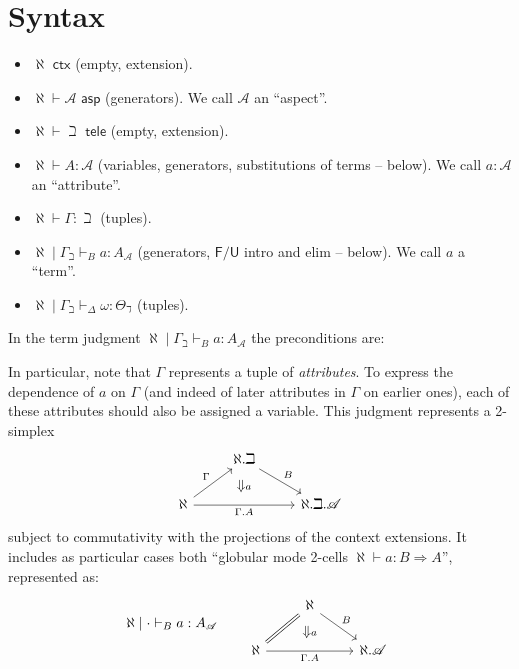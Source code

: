 \documentclass[10pt]{article}
\newcommand{\yields}{\vdash}
\newcommand{\cbar}{\mid}
\newcommand{\ctx}{\,\,\mathsf{ctx}}
\newcommand{\asp}{\,\,\mathsf{asp}}
\newcommand{\tele}{\,\,\mathsf{tele}}
\newcommand{\A}{\mathscr{A}}
\newcommand{\atA}{A}
\newcommand{\atB}{B}
\newcommand{\tma}{a}
\begin{document}
\section{Syntax}
\label{sec:syntax}

\begin{itemize}
\item $\aleph \ctx$ (empty, extension).
\item $\aleph \yields \A \asp$ (generators).  We call $\A$ an ``aspect''.
\item $\aleph \yields \beth \tele$ (empty, extension). %
\item $\aleph \yields \atA : \A$ (variables, generators, substitutions of terms -- below).  We call $a:\A$ an ``attribute''.
\item $\aleph \yields \Gamma : \beth$ (tuples). %
\item $\aleph \cbar \Gamma_\beth \yields_B \tma : \atA_\A$ (generators, $\mathsf{F}/\mathsf{U}$ intro and elim -- below).  We call $\tma$ a ``term''.
\item $\aleph \cbar \Gamma_\beth \yields_\Delta \omega : \Theta_\daleth$ (tuples).
\end{itemize}
In the term judgment $\aleph \cbar \Gamma_\beth \yields_B \tma : \atA_\A$ the preconditions are:
In particular, note that $\Gamma$ represents a tuple of \emph{attributes}.
To express the dependence of $\tma$ on $\Gamma$ (and indeed of later attributes in $\Gamma$ on earlier ones), each of these attributes should also be assigned a variable.
This judgment represents a 2-simplex
\[
\begin{tikzcd}
  & \aleph.\beth \ar[dr,"\atB"] \ar[d,phantom,"\Downarrow\scriptstyle \tma"] \\
  \aleph \ar[ur,"\Gamma"] \ar[rr,"\Gamma.\atA"'] & {} & \aleph.\beth.\A
\end{tikzcd}
\]
subject to commutativity with the projections of the context extensions.
It includes as particular cases both ``globular mode 2-cells $\aleph \yields \tma : \atB \Rightarrow \atA$'', represented as:
\[
\aleph \cbar \cdot \yields_\atB \tma : \atA_\A \qquad
\begin{tikzcd}
  & \aleph \ar[dr,"\atB"] \ar[d,phantom,"\Downarrow\scriptstyle \tma"] \\
  \aleph \ar[ur,equals] \ar[rr,"\Gamma.\atA"'] & {} & \aleph.\A
\end{tikzcd}
\]
\end{document}
